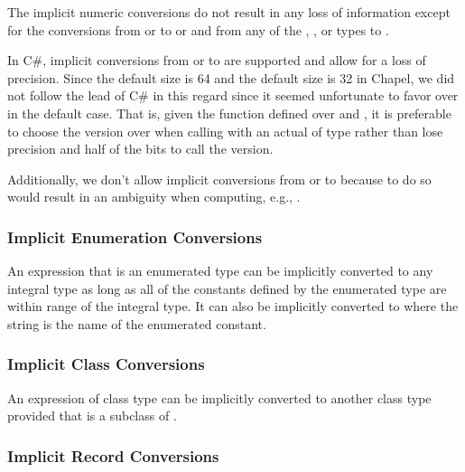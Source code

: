 The implicit numeric conversions do not result in any loss of
information except for the conversions from 
or  to  or  and from
any of the , , or  types
to .

\begin{rationale}
In C\#, implicit conversions from  or 
to  are supported and allow for a loss of precision.
Since the default  size is 64 and the default 
size is 32 in Chapel, we did not follow the lead of C\# in this regard
since it seemed unfortunate to favor  over 
in the default case.  That is, given the  function defined
over  and , it is preferable to choose the
version over  when calling with an actual of
type  rather than lose precision and half of the bits to
call the  version.

Additionally, we don't allow implicit conversions from 
or  to  because to do so would result in
an ambiguity when computing, e.g., .
\end{rationale}

\subsubsection{Implicit Enumeration Conversions}
\label{Implicit_Enumeration_Conversions}

An expression that is an enumerated type can be implicitly converted
to any integral type as long as all of the constants defined by the
enumerated type are within range of the integral type.  It can also be
implicitly converted to  where the string is the name of
the enumerated constant.

\subsubsection{Implicit Class Conversions}
\label{Implicit_Class_Conversions}

An expression of class type  can be implicitly converted to
another class type  provided that  is a subclass
of .

\subsubsection{Implicit Record Conversions}
\label{Implicit_Record_Conversions}

